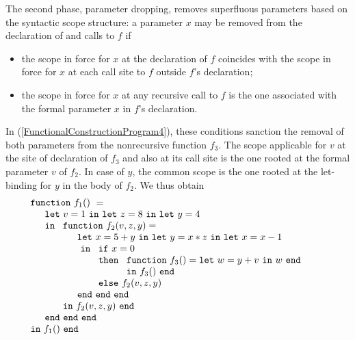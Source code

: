 The second phase, parameter dropping, removes superfluous parameters
based on the syntactic scope structure: a parameter $x$ may be removed
from the declaration of and calls to $f$ if
\begin{itemize}
\item the scope in force for $x$ at the declaration of $f$ coincides
  with the scope in force for $x$ at each call site to $f$
  outside $f$'s declaration;
\item the scope in force for $x$ at any recursive call to $f$ is the
  one associated with the formal parameter $x$ in $f$'s declaration.
\end{itemize}
In (\ref{FunctionalConstructionProgram4}), these conditions sanction
the removal of both parameters from the nonrecursive function $f_3$.
The scope applicable for $v$ at the site of declaration of $f_3$ and
also at its call site is the one rooted at the formal parameter $v$ of
$f_2$. In case of $y$, the common scope is the one rooted at the
let-binding for $y$ in the body of $f_2$. We thus obtain
\begin{equation}
\label{FunctionalConstructionProgram5}
\begin{array}{l}
\mathtt{function}\ f_1()\ = \\
  \quad
  \begin{array}{l}
     \mathtt{let}\ v = 1 \ 
     \mathtt{in\ let}\ z = 8 \ 
     \mathtt{in\ let}\ y = 4\\
     \mathtt{in}\ 
     \begin{array}[t]{l}
       \mathtt{function}\ f_2(v,z,y) =\\
         \quad
         \begin{array}{l}
           \mathtt{let}\ x = 5+y\
           \mathtt{in\ let}\ y = x*z\
           \mathtt{in\ let}\ x = x-1\\\
           \mathtt{in}\
           \begin{array}[t]{l}
             \mathtt{if}\ x=0\\ 
             \mathtt{then}\ 
               \begin{array}[t]{l}
                 \mathtt{function}\ f_3() = 
                 \mathtt{let}\ w = y+v\ \mathtt{in}\ w\ \mathtt{end}\\
                 \mathtt{in}\ f_3()\ \mathtt{end}
               \end{array}\\
             \mathtt{else}\ f_2(v,z,y)
           \end{array}\\
           \mathtt{end\ end\ end}
         \end{array}\\
     \mathtt{in}\ f_2(v,z,y)\ \mathtt{end}
     \end{array}\\
     \mathtt{end\ end\ end}\\
   \end{array}\\
\mathtt{in}\ f_1()\  \mathtt{end}
\end{array}
\end{equation}
